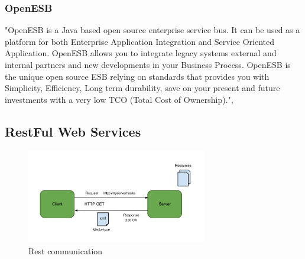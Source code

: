 \documentclass[12pt]{article}
\begin{document}
\subsubsection{OpenESB}
"OpenESB is a Java based open source enterprise service bus. It can be used as a platform for both Enterprise Application Integration and Service Oriented Application. OpenESB allows you to integrate legacy systems external and internal partners and new developments in your Business Process.  OpenESB is the unique open source ESB relying on standards that provides you with Simplicity, Efficiency, Long term durability, save on your present and future investments with a very low TCO (Total Cost of Ownership).", \cite{Aboutopenesb}


\subsection{RestFul Web Services}

\begin{figure}[here!]
	\centering
	\includegraphics[width=0.7\textwidth]{images/REST}
	\caption{Rest communication \cite{vogtbild1}}
    \label{fig:restcomm}
	\end{figure}
	\FloatBarrier \noindent
\end{document}
